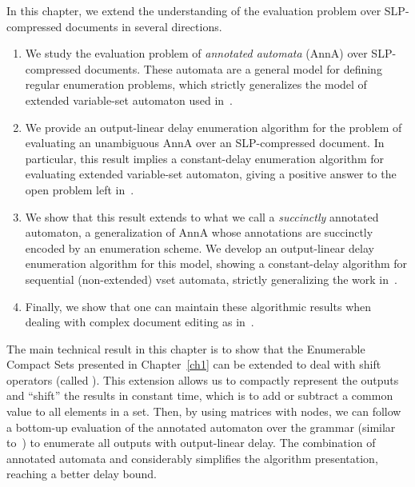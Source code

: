 In this chapter, we extend the understanding of the evaluation problem over SLP-compressed documents in several directions. 
\begin{enumerate}
	\item We study the evaluation problem of \emph{annotated automata} (AnnA) over SLP-compressed documents. These automata are a general model for defining regular enumeration problems, which strictly generalizes the model of extended variable-set automaton used in~\cite{SchmidS21}. 
	\item We provide an output-linear delay enumeration algorithm for the problem of evaluating an unambiguous AnnA over an SLP-compressed document. In particular, this result implies a constant-delay enumeration algorithm for evaluating extended variable-set automaton, giving a positive answer to the open problem left in~\cite{SchmidS21}.
	\item We show that this result extends to what we call a \emph{succinctly} annotated automaton, a generalization of AnnA whose annotations are succinctly encoded by an enumeration scheme. We develop an output-linear delay enumeration algorithm for this model, showing a constant-delay algorithm for sequential  (non-extended) vset automata, strictly generalizing the work in~\cite{SchmidS21}.
	\item Finally, we show that one can maintain these algorithmic results when dealing with complex document editing as in~\cite{SchmidS22}.
\end{enumerate}

The main technical result in this chapter is to show that the Enumerable Compact Sets presented in Chapter~\ref{ch1} can be extended to deal with shift operators (called \dsabbr). This extension allows us to compactly represent the outputs and ``shift'' the results in constant time, which is to add or subtract a common value to all elements in a set. 
Then, by using matrices with \dsabbr nodes, we can follow a bottom-up evaluation of the annotated automaton over the grammar (similar to~\cite{SchmidS21}) to enumerate all outputs with output-linear delay. The combination of annotated automata and \dsabbrs considerably simplifies the algorithm presentation, reaching a better delay bound.



